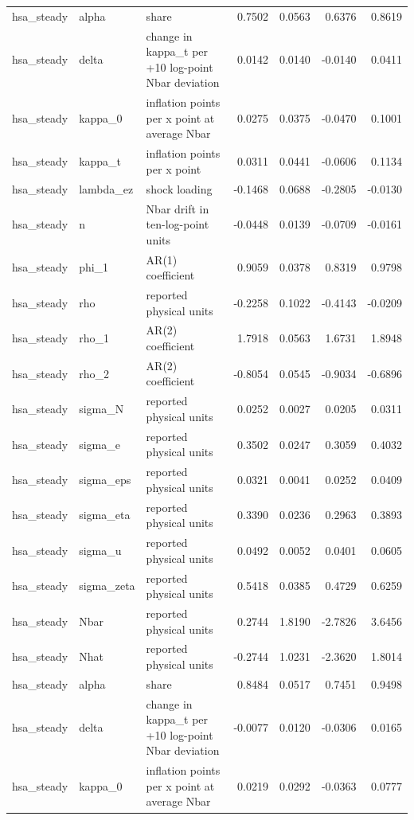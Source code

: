 \begin{tabular}{lllrrrr}
hsa\_steady & alpha & share & 0.7502 & 0.0563 & 0.6376 & 0.8619 \\
hsa\_steady & delta & change in kappa\_t per +10 log-point Nbar deviation & 0.0142 & 0.0140 & -0.0140 & 0.0411 \\
hsa\_steady & kappa\_0 & inflation points per x point at average Nbar & 0.0275 & 0.0375 & -0.0470 & 0.1001 \\
hsa\_steady & kappa\_t & inflation points per x point & 0.0311 & 0.0441 & -0.0606 & 0.1134 \\
hsa\_steady & lambda\_ez & shock loading & -0.1468 & 0.0688 & -0.2805 & -0.0130 \\
hsa\_steady & n & Nbar drift in ten-log-point units & -0.0448 & 0.0139 & -0.0709 & -0.0161 \\
hsa\_steady & phi\_1 & AR(1) coefficient & 0.9059 & 0.0378 & 0.8319 & 0.9798 \\
hsa\_steady & rho & reported physical units & -0.2258 & 0.1022 & -0.4143 & -0.0209 \\
hsa\_steady & rho\_1 & AR(2) coefficient & 1.7918 & 0.0563 & 1.6731 & 1.8948 \\
hsa\_steady & rho\_2 & AR(2) coefficient & -0.8054 & 0.0545 & -0.9034 & -0.6896 \\
hsa\_steady & sigma\_N & reported physical units & 0.0252 & 0.0027 & 0.0205 & 0.0311 \\
hsa\_steady & sigma\_e & reported physical units & 0.3502 & 0.0247 & 0.3059 & 0.4032 \\
hsa\_steady & sigma\_eps & reported physical units & 0.0321 & 0.0041 & 0.0252 & 0.0409 \\
hsa\_steady & sigma\_eta & reported physical units & 0.3390 & 0.0236 & 0.2963 & 0.3893 \\
hsa\_steady & sigma\_u & reported physical units & 0.0492 & 0.0052 & 0.0401 & 0.0605 \\
hsa\_steady & sigma\_zeta & reported physical units & 0.5418 & 0.0385 & 0.4729 & 0.6259 \\
hsa\_steady & Nbar & reported physical units & 0.2744 & 1.8190 & -2.7826 & 3.6456 \\
hsa\_steady & Nhat & reported physical units & -0.2744 & 1.0231 & -2.3620 & 1.8014 \\
hsa\_steady & alpha & share & 0.8484 & 0.0517 & 0.7451 & 0.9498 \\
hsa\_steady & delta & change in kappa\_t per +10 log-point Nbar deviation & -0.0077 & 0.0120 & -0.0306 & 0.0165 \\
hsa\_steady & kappa\_0 & inflation points per x point at average Nbar & 0.0219 & 0.0292 & -0.0363 & 0.0777 \\

\end{tabular}
